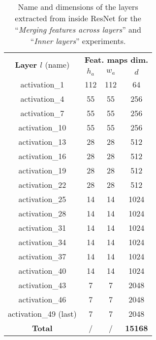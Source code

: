 \begin{table}
\centering
\begin{tabular}{|c|ccc|}
\hline
\multirow{2}{*}{\textbf{Layer $l$} (name)} & \multicolumn{3}{c|}{\textbf{Feat. maps dim.}}\\
& $h_a$ & $w_a$ & $d$ \\
\hline
activation\_1 & 112 & 112 & 64 \\
activation\_4 & 55 & 55 & 256 \\
activation\_7 & 55 & 55 & 256 \\
activation\_10 & 55 & 55 & 256 \\
activation\_13 & 28 & 28 & 512 \\
activation\_16 & 28 & 28 & 512 \\
activation\_19 & 28 & 28 & 512 \\
activation\_22 & 28 & 28 & 512 \\
activation\_25 & 14 & 14 & 1024 \\
activation\_28 & 14 & 14 & 1024 \\
activation\_31 & 14 & 14 & 1024 \\
activation\_34 & 14 & 14 & 1024 \\
activation\_37 & 14 & 14 & 1024 \\
activation\_40 & 14 & 14 & 1024 \\
activation\_43 & 7 & 7 & 2048 \\
activation\_46 & 7 & 7 & 2048 \\
activation\_49 (last) & 7 & 7 & 2048 \\
\hline
\textbf{Total} & / & / & \textbf{15168} \\
\hline 
\end{tabular}
\caption{Name and dimensions of the layers extracted from inside ResNet for the ``\textit{Merging features across layers}'' and ``\textit{Inner layers}'' experiments.}
\label{app:comp:tab:inner_layers_resnet}
\end{table}



